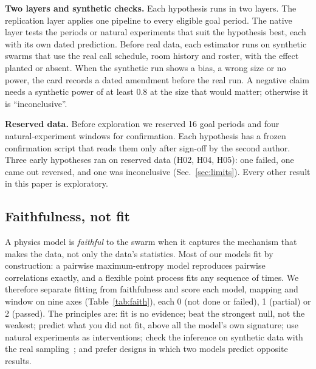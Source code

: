 \textbf{Two layers and synthetic checks.} Each hypothesis runs in two layers. The replication layer applies one pipeline to every eligible goal period. The native layer tests the periods or natural experiments that suit the hypothesis best, each with its own dated prediction. Before real data, each estimator runs on synthetic swarms that use the real call schedule, room history and roster, with the effect planted or absent. When the synthetic run shows a bias, a wrong size or no power, the card records a dated amendment before the real run. A negative claim needs a synthetic power of at least 0.8 at the size that would matter; otherwise it is ``inconclusive''.

\textbf{Reserved data.} Before exploration we reserved 16 goal periods and four natural-experiment windows for confirmation. Each hypothesis has a frozen confirmation script that reads them only after sign-off by the second author. Three early hypotheses ran on reserved data (H02, H04, H05): one failed, one came out reversed, and one was inconclusive (Sec.~\ref{sec:limits}). Every other result in this paper is exploratory.

\subsection{Faithfulness, not fit}\label{sec:faith}
A physics model is \emph{faithful} to the swarm when it captures the mechanism that makes the data, not only the data's statistics. Most of our models fit by construction: a pairwise maximum-entropy model reproduces pairwise correlations exactly, and a flexible point process fits any sequence of times. We therefore separate fitting from faithfulness and score each model, mapping and window on nine axes (Table~\ref{tab:faith}), each 0 (not done or failed), 1 (partial) or 2 (passed). The principles are: fit is no evidence; beat the strongest null, not the weakest; predict what you did not fit, above all the model's own signature; use natural experiments as interventions; check the inference on synthetic data with the real sampling~\cite{talts2018}; and prefer designs in which two models predict opposite results.

